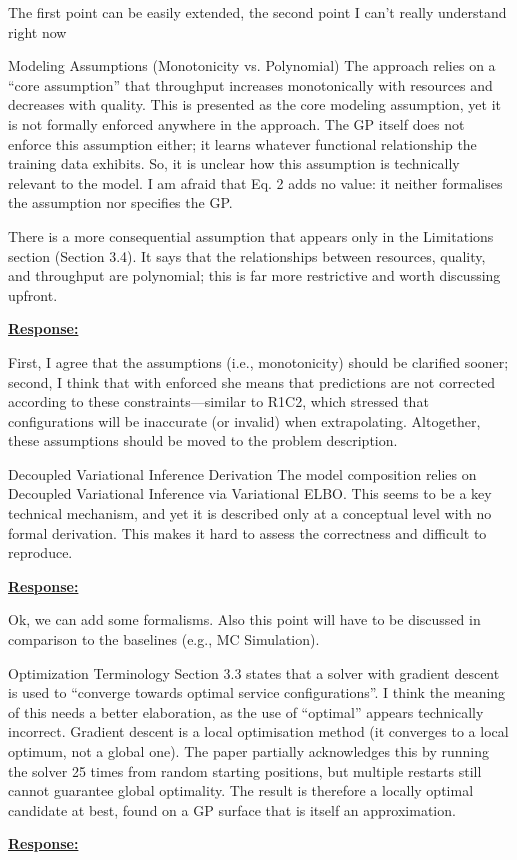 \documentclass{article}
\newcommand{\Response}[1][]{%
    \noindent\underline{\textbf{Response:}}\par\vspace{0.2cm}%
    #1\par\vspace{0.6cm}%
}
\begin{document}
The first point can be easily extended, the second point I can't really understand right now

\begin{cmt}{Modeling Assumptions (Monotonicity vs. Polynomial)}{}
The approach relies on a ``core assumption'' that throughput increases monotonically with resources and decreases with quality. This is presented as the core modeling assumption, yet it is not formally enforced anywhere in the approach. The GP itself does not enforce this assumption either; it learns whatever functional relationship the training data exhibits. So, it is unclear how this assumption is technically relevant to the model. I am afraid that Eq. 2 adds no value: it neither formalises the assumption nor specifies the GP.

There is a more consequential assumption that appears only in the Limitations section (Section 3.4). It says that the relationships between resources, quality, and throughput are polynomial; this is far more restrictive and worth discussing upfront.
\end{cmt}
\Response

First, I agree that the assumptions (i.e., monotonicity) should be clarified sooner; second, I think that with enforced she means that predictions are not corrected according to these constraints---similar to R1C2, which stressed that configurations will be inaccurate (or invalid) when extrapolating. Altogether, these assumptions should be moved to the problem description.

\begin{cmt}{Decoupled Variational Inference Derivation}{}
The model composition relies on Decoupled Variational Inference via Variational ELBO. This seems to be a key technical mechanism, and yet it is described only at a conceptual level with no formal derivation. This makes it hard to assess the correctness and difficult to reproduce.
\end{cmt}
\Response

Ok, we can add some formalisms. Also this point will have to be discussed in comparison to the baselines (e.g., MC Simulation).

\begin{cmt}{Optimization Terminology}{}
Section 3.3 states that a solver with gradient descent is used to ``converge towards optimal service configurations''. I think the meaning of this needs a better elaboration, as the use of ``optimal'' appears technically incorrect. Gradient descent is a local optimisation method (it converges to a local optimum, not a global one). The paper partially acknowledges this by running the solver 25 times from random starting positions, but multiple restarts still cannot guarantee global optimality. The result is therefore a locally optimal candidate at best, found on a GP surface that is itself an approximation.
\end{cmt}
\Response
\end{document}
